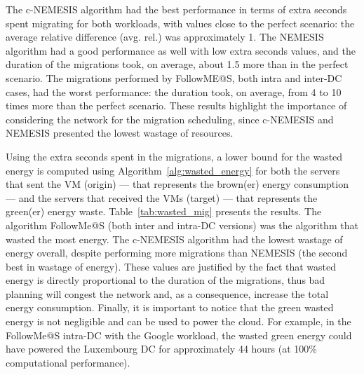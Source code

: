 The c-NEMESIS algorithm had the best performance in terms of extra seconds spent migrating for both workloads, with values close to the perfect scenario: the average relative difference (avg. rel.) was approximately 1. The NEMESIS algorithm had a good performance as well with low extra seconds values, and the duration of the migrations took, on average, about 1.5 more than in the perfect scenario. The migrations performed by FollowME@S, both intra and inter-DC cases, had the worst performance: the duration took, on average, from 4 to 10 times more than the perfect scenario. These results highlight the importance of considering the network for the migration scheduling, since c-NEMESIS and NEMESIS presented the lowest wastage of resources.
                      

Using the extra seconds spent in the migrations, a lower bound for the wasted energy is computed using Algorithm~\ref{alg:wasted_energy} for both the servers that sent the VM (origin) --- that represents the brown(er) energy consumption --- and the servers that received the VMs (target) --- that represents the green(er) energy waste. Table~\ref{tab:wasted_mig} presents the results. The algorithm FollowMe@S (both inter and intra-DC versions) was the algorithm that wasted the most energy. The c-NEMESIS algorithm had the lowest wastage of energy overall, despite performing more migrations than NEMESIS (the second best in wastage of energy). These values are justified by the fact that wasted energy is directly proportional to the duration of the migrations, thus bad planning will congest the network and, as a consequence, increase the total energy consumption. Finally, it is important to notice that the green wasted energy is not negligible and can be used to power the cloud. For example, in the FollowMe@S intra-DC with the Google workload, the wasted green energy could have powered the Luxembourg DC for approximately 44 hours (at 100\% computational performance).




